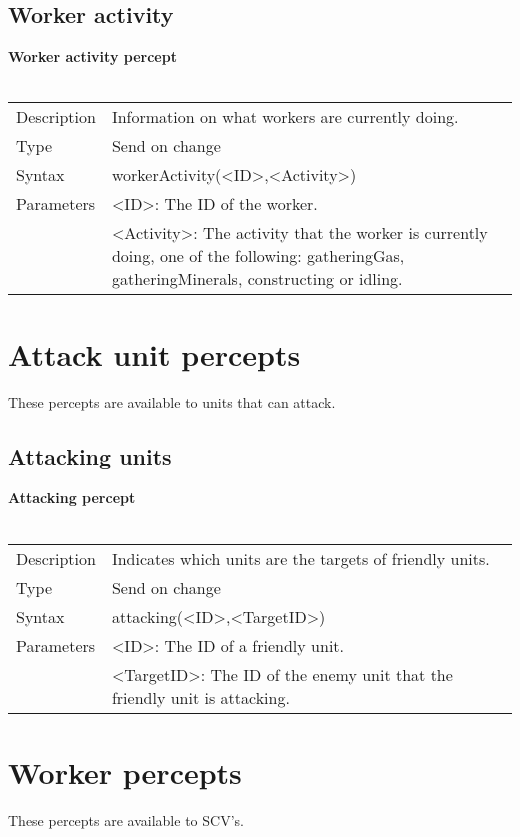 \documentclass[english,11pt]{report}
\begin{document}
\subsection{Worker activity}
\textbf{Worker activity percept}\\
\\
\begin{tabularx}{\textwidth}{lX}
 Description & Information on what workers are currently doing. \\
 Type & Send on change \\
 Syntax & workerActivity(<ID>,<Activity>) \\
 Parameters &   <ID>: The ID of the worker.\\
            &   <Activity>: The activity that the worker is currently doing, one of the following: gatheringGas, gatheringMinerals, constructing or idling.
\end{tabularx}

\newpage
\section{Attack unit percepts}
These percepts are available to units that can attack.

\subsection{Attacking units}
\textbf{Attacking percept}\\
\\
\begin{tabularx}{\textwidth}{lX}
 Description & Indicates which units are the targets of friendly units. \\
 Type & Send on change \\
 Syntax & attacking(<ID>,<TargetID>) \\
 Parameters &   <ID>: The ID of a friendly unit.\\
            &   <TargetID>: The ID of the enemy unit that the friendly unit is attacking.
\end{tabularx}

\newpage
\section{Worker percepts}
These percepts are available to SCV's.
\end{document}

